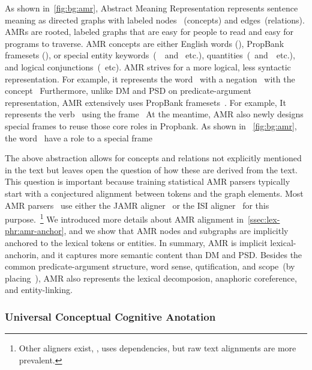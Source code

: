 As shown in~\autoref{fig:bg:amr}, Abstract Meaning Representation
represents sentence meaning as directed graphs with labeled nodes
~(concepts) and edges~(relations). AMRs are rooted, labeled graphs
that are easy for people to read and easy for programs to traverse.
AMR concepts are either English words (), PropBank
framesets (), or special entity
keywords~(~~and~
etc.), quantities~(~and~~etc.), and logical
conjunctions~(~etc).  AMR strives for a more logical,
less syntactic representation. For example, it represents the
word~ with a negation~
with the concept~ Furthermore, unlike DM and PSD
on predicate-argument representation, AMR extensively uses PropBank
framesets~\citep{Kin:Pal:02, palmer2005proposition}. For example, It
represents the verb~ using the
frame~ At the meantime, AMR also newly designs
special frames to reuse those core roles in Propbank. As shown in
~\autoref{fig:bg:amr}, the word~ have a role
 to a special frame~

The above abstraction allows for concepts and relations not explicitly
mentioned in the text but leaves open the question of how these are
derived from the text. This question is important because training
statistical AMR parsers typically start with a conjectured alignment
between tokens and the graph elements. Most AMR
parsers~\cite[\eg][]{Flanigan:2014vc,Wang:2015uo,Artzi:2009tb,Pust:2015ug,Peng:2015tj,Konstas:2017uj,Wang:2017vt}
use either the JAMR aligner~\cite{Flanigan:2014vc} or the ISI
aligner~\cite{Pourdamghani:2014aligning} for this
purpose.~\footnote{Other aligners exist, \eg,
  \citet{chen2017unsupervised} uses dependencies, but raw text
  alignments are more prevalent.}  We introduced more details about
AMR alignment in~\autoref{ssec:lex-phr:amr-anchor}, and we show that
AMR nodes and subgraphs are implicitly anchored to the lexical tokens
or entities. In summary, AMR is implicit lexical-anchorin, and it
captures more semantic content than DM and PSD. Besides the common
predicate-argument structure, word sense, qutification, and scope~(by
placing~), AMR also represents the lexical
decomposion, anaphoric coreference, and entity-linking.

\subsubsection{Universal Conceptual Cognitive Anotation}
\label{ssec:bg:ucca}

